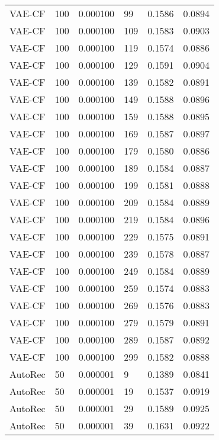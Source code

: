 \begin{tabular}{llrlrr}
  VAE-CF &  100 &  0.000100 &    99 &  0.1586 &       0.0894 \\
  VAE-CF &  100 &  0.000100 &   109 &  0.1583 &       0.0903 \\
  VAE-CF &  100 &  0.000100 &   119 &  0.1574 &       0.0886 \\
  VAE-CF &  100 &  0.000100 &   129 &  0.1591 &       0.0904 \\
  VAE-CF &  100 &  0.000100 &   139 &  0.1582 &       0.0891 \\
  VAE-CF &  100 &  0.000100 &   149 &  0.1588 &       0.0896 \\
  VAE-CF &  100 &  0.000100 &   159 &  0.1588 &       0.0895 \\
  VAE-CF &  100 &  0.000100 &   169 &  0.1587 &       0.0897 \\
  VAE-CF &  100 &  0.000100 &   179 &  0.1580 &       0.0886 \\
  VAE-CF &  100 &  0.000100 &   189 &  0.1584 &       0.0887 \\
  VAE-CF &  100 &  0.000100 &   199 &  0.1581 &       0.0888 \\
  VAE-CF &  100 &  0.000100 &   209 &  0.1584 &       0.0889 \\
  VAE-CF &  100 &  0.000100 &   219 &  0.1584 &       0.0896 \\
  VAE-CF &  100 &  0.000100 &   229 &  0.1575 &       0.0891 \\
  VAE-CF &  100 &  0.000100 &   239 &  0.1578 &       0.0887 \\
  VAE-CF &  100 &  0.000100 &   249 &  0.1584 &       0.0889 \\
  VAE-CF &  100 &  0.000100 &   259 &  0.1574 &       0.0883 \\
  VAE-CF &  100 &  0.000100 &   269 &  0.1576 &       0.0883 \\
  VAE-CF &  100 &  0.000100 &   279 &  0.1579 &       0.0891 \\
  VAE-CF &  100 &  0.000100 &   289 &  0.1587 &       0.0892 \\
  VAE-CF &  100 &  0.000100 &   299 &  0.1582 &       0.0888 \\
 AutoRec &   50 &  0.000001 &     9 &  0.1389 &       0.0841 \\
 AutoRec &   50 &  0.000001 &    19 &  0.1537 &       0.0919 \\
 AutoRec &   50 &  0.000001 &    29 &  0.1589 &       0.0925 \\
 AutoRec &   50 &  0.000001 &    39 &  0.1631 &       0.0922 \\

\end{tabular}
